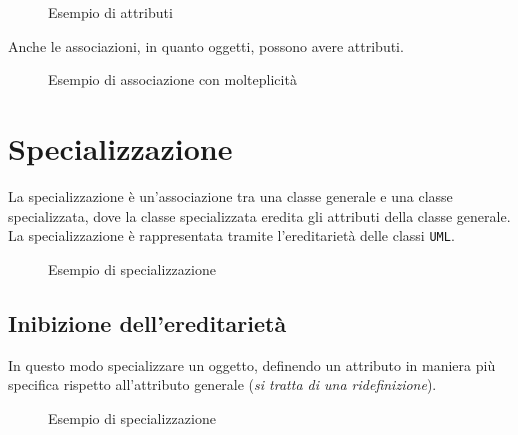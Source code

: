 \begin{figure}[H]
    \centering
    \caption{Esempio di attributi}
\end{figure}
Anche le associazioni, in quanto oggetti, possono avere attributi.
\begin{figure}[H]
    \centering
    \caption{Esempio di associazione con molteplicità}
\end{figure}

\section{Specializzazione}
\begin{tcolorbox}[colback=orange!5!white,colframe=orange!75!black, title=Specializzazione]
    La specializzazione è un'associazione tra una classe generale e una classe 
    specializzata, dove la classe specializzata eredita gli attributi della classe 
    generale. La specializzazione è rappresentata tramite l'ereditarietà delle classi 
    \texttt{UML}.
\end{tcolorbox}

\begin{figure}[H]
    \centering
    \caption{Esempio di specializzazione}
\end{figure}
\subsection{Inibizione dell'ereditarietà}
In questo modo specializzare un oggetto, definendo un attributo in maniera 
più specifica rispetto all'attributo generale (\textit{si tratta di una ridefinizione}).
\begin{figure}[H]
    \centering
    \caption{Esempio di specializzazione}
\end{figure}
